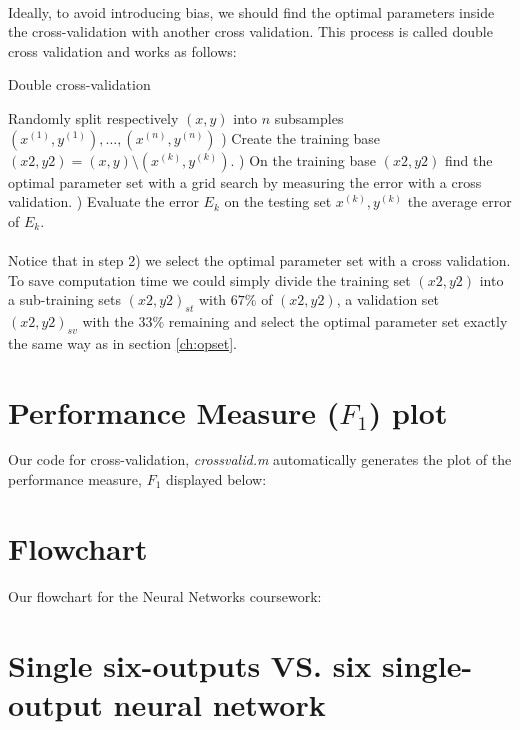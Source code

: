\documentclass[a4paper,12pt,oneside,final]{report}
\begin{document}
\paragraph{}
Ideally, to avoid introducing bias, we should find the optimal parameters inside the cross-validation with another cross validation. This process is called double cross validation and works as follows:
\begin{algorithm}[H]
\caption{Double cross-validation}
\label{al:dcv}
\begin{algorithmic}[1]
\STATE Randomly split respectively $(x, y)$ into $n$ subsamples $(x^{(1)}, y^{(1)}),\hdots,(x^{(n)}, y^{(n)})$
    ) Create the training base $(x2,y2)=(x, y)\setminus(x^{(k)}, y^{(k)})$.
    ) On the training base $(x2,y2)$ find the optimal parameter set with a grid search by measuring the error with a cross validation.
    ) Evaluate the error $E_k$ on the testing set $x^{(k)}, y^{(k)}$
\ENDFOR
{} the average error of $E_k$.
\end{algorithmic}
\end{algorithm}
\paragraph{}
Notice that in step 2) we select the optimal parameter set with a cross validation. To save computation time we could simply divide the training set $(x2,y2)$ into a sub-training sets $(x2,y2)_{st}$ with $67\%$ of $(x2,y2)$, a validation set $(x2,y2)_{sv}$ with the $33\%$ remaining and select the optimal parameter set exactly the same way as in section \ref{ch:opset}.

\section{Performance Measure ($F_1$) plot}
Our code for cross-validation, \textit{crossvalid.m} automatically generates the plot of the performance measure, $F_1$ displayed below:


\section{Flowchart}
Our flowchart for the Neural Networks coursework:


\section{Single six-outputs VS. six single-output neural network}
\end{document}
